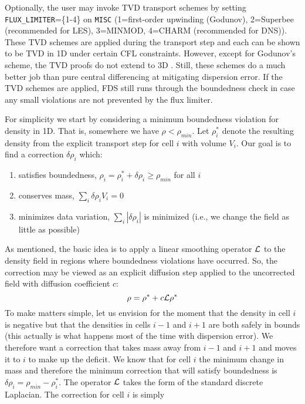 \documentclass[11pt]{book}
\begin{document}
Optionally, the user may invoke TVD transport schemes by setting {\tt FLUX\_LIMITER}=\{1-4\} on {\tt MISC} (1=first-order upwinding (Godunov), 2=Superbee \cite{Roe:1986} (recommended for LES), 3=MINMOD, 4=CHARM \cite{Zhou:1995} (recommended for DNS)). These TVD schemes are applied during the transport step and each can be shown to be TVD in 1D under certain CFL constraints.  However, except for Godunov's scheme, the TVD proofs do not extend to 3D \cite{Toro}.  Still, these schemes do a much better job than pure central differencing at mitigating dispersion error.  If the TVD schemes are applied, FDS still runs through the boundedness check in case any small violations are not prevented by the flux limiter.

For simplicity we start by considering a minimum boundedness violation for density in 1D.  That is, somewhere we have $\rho < \rho_{min}$.  Let $\rho_i^*$ denote the resulting density from the explicit transport step for cell $i$ with volume $V_i$.  Our goal is to find a correction $\delta \rho_i$ which:
\begin{enumerate}[{(}a{)}]
\item satisfies boundedness, $\rho_i = \rho_i^* + \delta \rho_i \ge \rho_{min}$ for all $i$
\item conserves mass, $\sum_i \delta \rho_i V_i = 0$
\item minimizes data variation, $\sum_i |\delta \rho_i|$ is minimized (i.e., we change the field as little as possible)
\end{enumerate}

As mentioned, the basic idea is to apply a linear smoothing operator $\cal L$ to the density field in regions where boundedness violations have occurred. So, the correction may be viewed as an explicit diffusion step applied to the uncorrected field with diffusion coefficient $c$:
\begin{equation}
\rho = \rho^* + c {\cal L} \rho^*
\end{equation}
To make matters simple, let us envision for the moment that the density in cell $i$ is negative but that the densities in cells $i-1$ and $i+1$ are both safely in bounds (this actually is what happens most of the time with dispersion error).  We therefore want a correction that takes mass away from $i-1$ and $i+1$ and moves it to $i$ to make up the deficit.  We know that for cell $i$ the minimum change in mass and therefore the minimum correction that will satisfy boundedness is $\delta \rho_i = \rho_{min} - \rho_i^*$.  The operator $\cal L$ takes the form of the standard discrete Laplacian.  The correction for cell $i$ is simply
\end{document}
